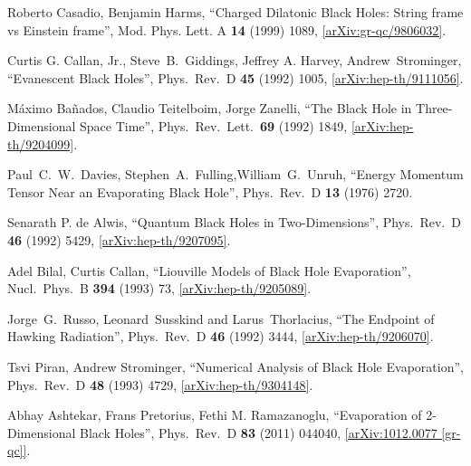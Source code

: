 \documentclass[12pt]{article}
\newcommand{\2}{$^2$}
\newcommand{\3}{$^3$}
\newcommand{\4}{$_4$}
\newcommand{\5}{$_5$}
\begin{document}
\begin{thebibliography}{400}
Roberto Casadio, Benjamin Harms, ``Charged Dilatonic Black Holes: String frame vs Einstein frame'', Mod. Phys. Lett. A \textbf{14} (1999) 1089, \href{http://arxiv.org/abs/gr-qc/9806032}{[arXiv:gr-qc/9806032]}.

Curtis G. Callan, Jr., Steve~B.~Giddings, Jeffrey A. Harvey, Andrew~Strominger,
  ``Evanescent Black Holes'',
  Phys.\ Rev.\ D {\bf 45} (1992) 1005, \href{http://arxiv-web3.library.cornell.edu/abs/hep-th/9111056v1}{
  [arXiv:hep-th/9111056]}.

  M\'aximo Ba\~nados, Claudio Teitelboim, Jorge Zanelli,
  ``The Black Hole in Three-Dimensional Space Time'',
  Phys.\ Rev.\ Lett.\  {\bf 69} (1992) 1849, \href{http://arxiv.org/abs/hep-th/9204099}{
  [arXiv:hep-th/9204099]}.

  Paul~C.~W.~Davies, Stephen~A.~Fulling,William~G.~Unruh,
  ``Energy Momentum Tensor Near an Evaporating Black Hole'',
  Phys.\ Rev.\  D {\bf 13} (1976) 2720.

  Senarath P. de Alwis,
  ``Quantum Black Holes in Two-Dimensions'',
  Phys.\ Rev.\ D {\bf 46} (1992) 5429, \href{http://arxiv.org/abs/hep-th/9207095}{
  [arXiv:hep-th/9207095]}.

  Adel Bilal, Curtis Callan,
  ``Liouville Models of Black Hole Evaporation'', 
  Nucl.\ Phys.\ B {\bf 394} (1993) 73, \href{http://arxiv.org/abs/hep-th/9205089}{
  [arXiv:hep-th/9205089]}.

  Jorge~G.~Russo, Leonard~Susskind and Larus~Thorlacius,
  ``The Endpoint of Hawking Radiation'',
  Phys.\ Rev.\ D {\bf 46} (1992) 3444,
  \href{http://arxiv.org/abs/hep-th/9206070}{[arXiv:hep-th/9206070]}.

  Tsvi Piran, Andrew Strominger,
  ``Numerical Analysis of Black Hole Evaporation'',
  Phys.\ Rev.\ D {\bf 48} (1993) 4729, \href{http://arxiv.org/abs/hep-th/9304148}{
  [arXiv:hep-th/9304148]}.

 Abhay Ashtekar, Frans Pretorius, Fethi M. Ramazanoglu,
  ``Evaporation of 2-Dimensional Black Holes'',
  Phys.\ Rev.\ D {\bf 83} (2011) 044040, \href{http://arxiv.org/abs/1012.0077}{
  [arXiv:1012.0077 [gr-qc]]}.


\end{thebibliography}
\end{document}
